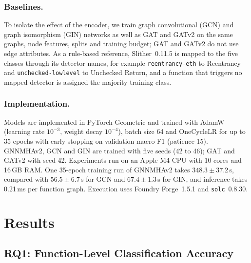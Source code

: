 \documentclass[runningheads]{llncs}
\begin{document}
\subsubsection{Baselines.}
To isolate the effect of the encoder, we train graph convolutional (GCN) and graph isomorphism (GIN) networks as well as GAT and GATv2 on the same graphs, node features, splits and training budget; GAT and GATv2 do not use edge attributes. As a rule-based reference, Slither~0.11.5 is mapped to the five classes through its detector names, for example \texttt{reentrancy-eth} to Reentrancy and \texttt{unchecked-lowlevel} to Unchecked Return, and a function that triggers no mapped detector is assigned the majority training class.

\subsubsection{Implementation.}
Models are implemented in PyTorch Geometric and trained with AdamW (learning rate $10^{-3}$, weight decay $10^{-4}$), batch size 64 and OneCycleLR for up to 35 epochs with early stopping on validation macro-F1 (patience 15). GNNMHAv2, GCN and GIN are trained with five seeds (42 to 46); GAT and GATv2 with seed 42. Experiments run on an Apple M4 CPU with 10 cores and 16\,GB RAM. One 35-epoch training run of GNNMHAv2 takes $348.3\pm37.2$\,s, compared with $56.5\pm6.7$\,s for GCN and $67.4\pm1.3$\,s for GIN, and inference takes 0.21\,ms per function graph. Execution uses Foundry Forge~1.5.1 and \texttt{solc}~0.8.30.

\section{Results}
\label{sec:results}

\subsection{RQ1: Function-Level Classification Accuracy}
\label{sec:rq1}
\end{document}
